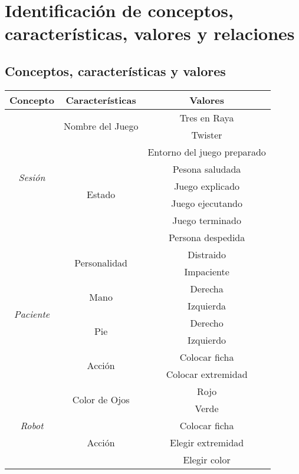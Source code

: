\documentclass{uc3mpracticas}
\begin{document}
  \mainmatter

  \section{Identificación de conceptos, características, valores y relaciones}

  \subsection{Conceptos, características y valores}


  \begin{center}
    \begin{tabular}{|c|c|c|}
    \hline
    \textbf{Concepto} & \textbf{Características} & \textbf{Valores}\\
    \hline \hline \hline
    \multirow{8}{*}{\textit{Sesión}} & \multirow{2}{*}{Nombre del Juego} & Tres en Raya \\
    & & Twister \\
    \cline{2-3}
    & \multirow{6}{*}{Estado} & Entorno del juego preparado \\
    & & Pesona saludada \\
    & & Juego explicado \\
    & & Juego ejecutando \\
    & & Juego terminado \\
    & & Persona despedida \\
    \hline \hline
    \multirow{8}{*}{\textit{Paciente}} & \multirow{2}{*}{Personalidad} & Distraido \\
    & & Impaciente \\
    \cline{2-3}
    & \multirow{2}{*}{Mano} & Derecha \\
    & & Izquierda \\
    \cline{2-3}
    & \multirow{2}{*}{Pie} & Derecho \\
    & & Izquierdo \\
    \cline{2-3}
    & \multirow{2}{*}{Acción} & Colocar ficha \\
    & & Colocar extremidad \\
    \hline \hline
    \multirow{11}{*}{\textit{Robot}} & \multirow{2}{*}{Color de Ojos} & Rojo \\
    & & Verde \\
    \cline{2-3}
    & \multirow{9}{*}{Acción} & Colocar ficha \\
    & & Elegir extremidad \\
    & & Elegir color \\

\end{tabular}
\end{center}
\end{document}
